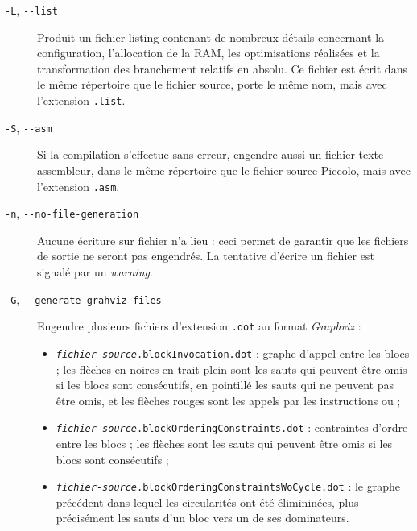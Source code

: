 \begin{description}
  \item[\texttt{-L}, \texttt{-{-}list}] Produit un fichier listing contenant de nombreux détails concernant la configuration, l’allocation de la RAM, les optimisations réalisées et la transformation des branchement relatifs en absolu. Ce fichier est écrit dans le même répertoire que le fichier source, porte le même nom, mais avec l’extension \texttt{.list}.

  \item[\texttt{-S}, \texttt{-{-}asm}] Si la compilation s’effectue sans erreur, engendre aussi un fichier texte assembleur, dans le même répertoire que le fichier source Piccolo, mais avec l’extension \texttt{.asm}.

  \item[\texttt{-n}, \texttt{-{-}no-file-generation}] Aucune écriture sur fichier n’a lieu : ceci permet de garantir que les fichiers de sortie ne seront pas engendrés. La tentative d’écrire un fichier est signalé par un \emph{warning}.




  \item[\texttt{-G}, \texttt{-{-}generate-grahviz-files}] Engendre plusieurs fichiers d'extension \texttt{.dot} au format \emph{Graphviz} :
\begin{itemize}
\item \texttt{\emph{fichier-source}.blockInvocation.dot} : graphe d'appel entre les blocs ; les flèches en noires en trait plein sont les sauts qui peuvent être omis si les blocs sont consécutifs, en pointillé les sauts qui ne peuvent pas être omis, et les flèches rouges sont les appels par les instructions  ou  ; 
\item \texttt{\emph{fichier-source}.blockOrderingConstraints.dot} : contraintes d'ordre entre les blocs ; les flèches sont les sauts qui peuvent être omis si les blocs sont consécutifs ; 
\item \texttt{\emph{fichier-source}.blockOrderingConstraintsWoCycle.dot} : le graphe précédent dans lequel les circularités ont été élimininées, plus précisément les sauts d'un bloc vers un de ses dominateurs. 
\end{itemize}


\end{description}
